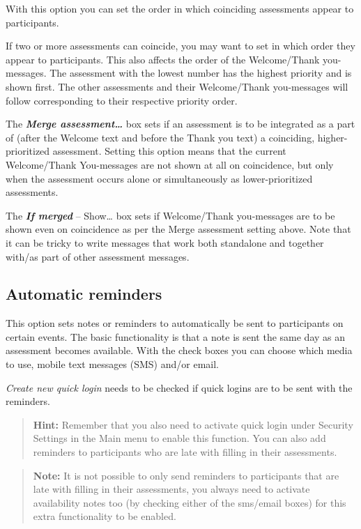 \documentclass[
]{book}
\begin{document}
With this option you can set the order in which coinciding assessments appear to participants.

If two or more assessments can coincide, you may want to set in which order they appear to participants. This also affects the order of the Welcome/Thank you-messages. The assessment with the lowest number has the highest priority and is shown first. The other assessments and their Welcome/Thank you-messages will follow corresponding to their respective priority order.

The \textbf{\emph{Merge assessment\ldots{}}} box sets if an assessment is to be integrated as a part of (after the Welcome text and before the Thank you text) a coinciding, higher-prioritized assessment. Setting this option means that the current Welcome/Thank You-messages are not shown at all on coincidence, but only when the assessment occurs alone or simultaneously as lower-prioritized assessments.

The \textbf{\emph{If merged}} -- Show\ldots{} box sets if Welcome/Thank you-messages are to be shown even on coincidence as per the Merge assessment setting above. Note that it can be tricky to write messages that work both standalone and together with/as part of other assessment messages.

\subsection{Automatic reminders}\label{automatic-reminders}

This option sets notes or reminders to automatically be sent to participants on certain events. The basic functionality is that a note is sent the same day as an assessment becomes available. With the check boxes you can choose which media to use, mobile text messages (SMS) and/or email.

\emph{Create new quick login} needs to be checked if quick logins are to be sent with the reminders.

\begin{quote}
\textbf{Hint:} Remember that you also need to activate quick login under Security Settings in the Main menu to enable this function.
You can also add reminders to participants who are late with filling in their assessments.
\end{quote}

\begin{quote}
\textbf{Note:} It is not possible to only send reminders to participants that are late with filling in their assessments, you always need to activate availability notes too (by checking either of the sms/email boxes) for this extra functionality to be enabled.
\end{quote}
\end{document}
